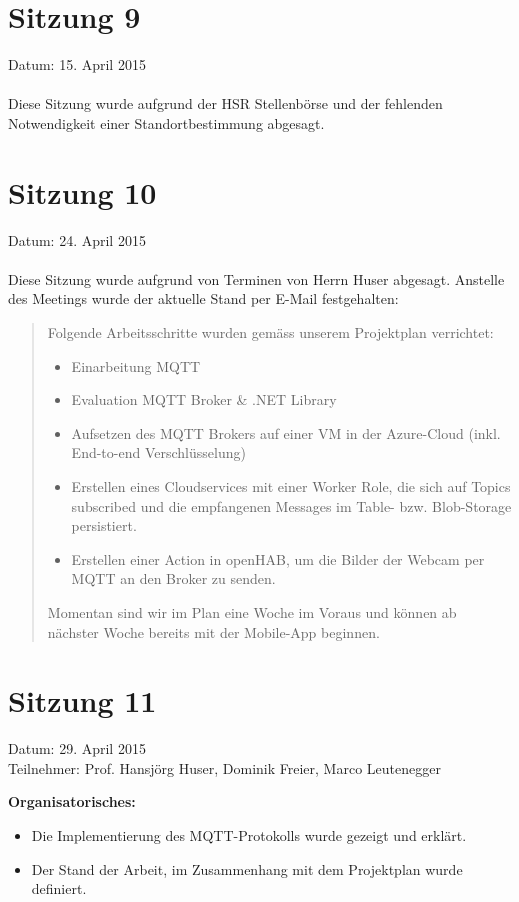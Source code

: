 \section*{Sitzung 9}
	Datum: 15. April 2015 \\
	\\Diese Sitzung wurde aufgrund der HSR Stellenbörse und der fehlenden Notwendigkeit einer Standortbestimmung abgesagt.
	
\section*{Sitzung 10}
	Datum: 24. April 2015 \\
	\\Diese Sitzung wurde aufgrund von Terminen von Herrn Huser abgesagt. Anstelle des Meetings wurde der aktuelle Stand per E-Mail festgehalten:
	\begin{quote}
	Folgende Arbeitsschritte wurden gemäss unserem Projektplan verrichtet:
	\begin{itemize}
		\item Einarbeitung MQTT
		\item Evaluation MQTT Broker \& .NET Library
		\item Aufsetzen des MQTT Brokers auf einer VM in der Azure-Cloud (inkl. End-to-end Verschlüsselung)
		\item Erstellen eines Cloudservices mit einer Worker Role, die sich auf Topics subscribed und die empfangenen Messages im Table- bzw. Blob-Storage persistiert.
		\item Erstellen einer Action in openHAB, um die Bilder der Webcam per MQTT an den Broker zu senden.
	\end{itemize}
	Momentan sind wir im Plan eine Woche im Voraus und können ab nächster Woche bereits mit der Mobile-App beginnen.	
	\end{quote}
	
\section*{Sitzung 11}
	Datum: 29. April 2015 \\
	Teilnehmer: Prof. Hansjörg Huser, Dominik Freier, Marco Leutenegger

	\textbf{Organisatorisches:}
	\begin{itemize}
		\item Die Implementierung des MQTT-Protokolls wurde gezeigt und erklärt.
		\item Der Stand der Arbeit, im Zusammenhang mit dem Projektplan wurde definiert.
	\end{itemize}

